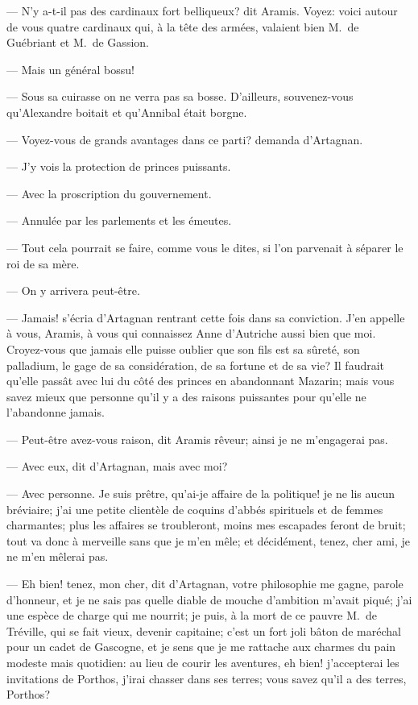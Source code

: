 — N'y a-t-il pas des cardinaux fort belliqueux? dit Aramis. Voyez: voici autour de vous quatre cardinaux qui, à la tête des armées, valaient bien M.~de Guébriant et M.~de Gassion.

— Mais un général bossu!

— Sous sa cuirasse on ne verra pas sa bosse. D'ailleurs, souvenez-vous qu'Alexandre boitait et qu'Annibal était borgne.

— Voyez-vous de grands avantages dans ce parti? demanda d'Artagnan.

— J'y vois la protection de princes puissants.

— Avec la proscription du gouvernement.

— Annulée par les parlements et les émeutes.

— Tout cela pourrait se faire, comme vous le dites, si l'on parvenait à séparer le roi de sa mère.

— On y arrivera peut-être.

— Jamais! s'écria d'Artagnan rentrant cette fois dans sa conviction. J'en appelle à vous, Aramis, à vous qui connaissez Anne d'Autriche aussi bien que moi. Croyez-vous que jamais elle puisse oublier que son fils est sa sûreté, son palladium, le gage de sa considération, de sa fortune et de sa vie? Il faudrait qu'elle passât avec lui du côté des princes en abandonnant Mazarin; mais vous savez mieux que personne qu'il y a des raisons puissantes pour qu'elle ne l'abandonne jamais.

— Peut-être avez-vous raison, dit Aramis rêveur; ainsi je ne m'engagerai pas.

— Avec eux, dit d'Artagnan, mais avec moi?

— Avec personne. Je suis prêtre, qu'ai-je affaire de la politique! je ne lis aucun bréviaire; j'ai une petite clientèle de coquins d'abbés spirituels et de femmes charmantes; plus les affaires se troubleront, moins mes escapades feront de bruit; tout va donc à merveille sans que je m'en mêle; et décidément, tenez, cher ami, je ne m'en mêlerai pas.

— Eh bien! tenez, mon cher, dit d'Artagnan, votre philosophie me gagne, parole d'honneur, et je ne sais pas quelle diable de mouche d'ambition m'avait piqué; j'ai une espèce de charge qui me nourrit; je puis, à la mort de ce pauvre M.~de Tréville, qui se fait vieux, devenir capitaine; c'est un fort joli bâton de maréchal pour un cadet de Gascogne, et je sens que je me rattache aux charmes du pain modeste mais quotidien: au lieu de courir les aventures, eh bien! j'accepterai les invitations de Porthos, j'irai chasser dans ses terres; vous savez qu'il a des terres, Porthos?


